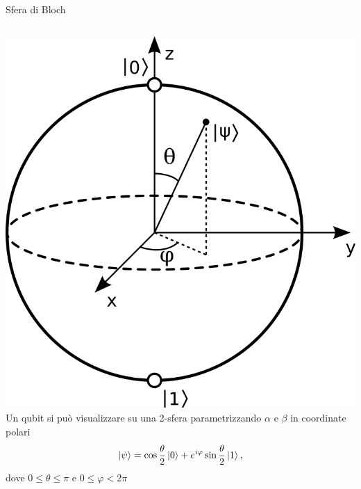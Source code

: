 \documentclass{beamer}
\begin{document}
    \begin{frame}{Sfera di Bloch}
        \begin{columns}
            \includegraphics[width=\textwidth]{gfx/Bloch_sphere.png}
            Un qubit si può visualizzare su una 2-sfera parametrizzando $\alpha$ e $\beta$ in coordinate polari
            \begin{equation}
                \ket{\psi} = \cos \frac{\theta}{2} \ket{0} + e^{i\varphi}\sin \frac{\theta}{2} \ket{1},
            \end{equation}
            dove $0\leq\theta\leq\pi$ e $0\leq\varphi<2\pi$
        \end{columns}
    \end{frame}
\end{document}
